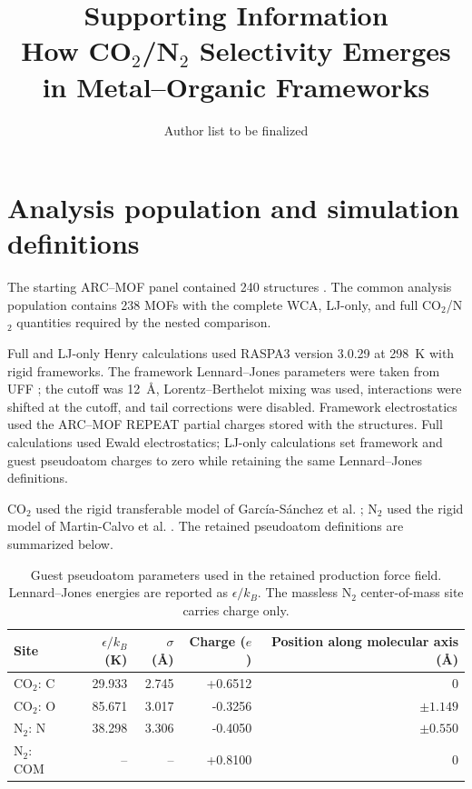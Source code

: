\documentclass[11pt,a4paper]{article}
\title{Supporting Information\\How CO$_2$/N$_2$ Selectivity Emerges in Metal--Organic Frameworks}
\author{Author list to be finalized}
\date{}
\begin{document}
\maketitle
\tableofcontents

\section{Analysis population and simulation definitions}

The starting ARC--MOF panel contained 240 structures \cite{burner2023arcmof}. The common analysis population contains 238 MOFs with the complete WCA, LJ-only, and full CO$_2$/N$_2$ quantities required by the nested comparison.

Full and LJ-only Henry calculations used RASPA3 version 3.0.29 \cite{ran2024raspa3,dubbeldam2016raspa} at 298~K with rigid frameworks. The framework Lennard--Jones parameters were taken from UFF \cite{rappe1992uff}; the cutoff was 12~\AA{}, Lorentz--Berthelot mixing was used, interactions were shifted at the cutoff, and tail corrections were disabled. Framework electrostatics used the ARC--MOF REPEAT partial charges stored with the structures. Full calculations used Ewald electrostatics; LJ-only calculations set framework and guest pseudoatom charges to zero while retaining the same Lennard--Jones definitions.

CO$_2$ used the rigid transferable model of Garc\'ia-S\'anchez et al. \cite{garciasanchez2009co2}; N$_2$ used the rigid model of Martin-Calvo et al. \cite{martincalvo2015gases}. The retained pseudoatom definitions are summarized below.

\begin{table}[H]
\centering
\caption{Guest pseudoatom parameters used in the retained production force field. Lennard--Jones energies are reported as $\epsilon/k_B$. The massless N$_2$ center-of-mass site carries charge only.}
\begin{tabular}{lrrrr}
\toprule
Site & $\epsilon/k_B$ (K) & $\sigma$ (\AA{}) & Charge ($e$) & Position along molecular axis (\AA{})\\
\midrule
CO$_2$: C & 29.933 & 2.745 & +0.6512 & 0\\
CO$_2$: O & 85.671 & 3.017 & -0.3256 & $\pm 1.149$\\
N$_2$: N & 38.298 & 3.306 & -0.4050 & $\pm 0.550$\\
N$_2$: COM & -- & -- & +0.8100 & 0\\
\bottomrule
\end{tabular}
\end{table}
\end{document}
